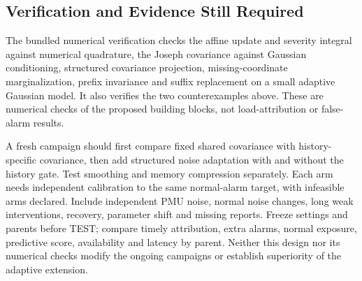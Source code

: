 \subsection{Verification and Evidence Still Required}
The bundled numerical verification checks the
affine update and severity integral against numerical quadrature, the
Joseph covariance against Gaussian conditioning, structured covariance
projection, missing-coordinate marginalization, prefix invariance and
suffix replacement on a small adaptive Gaussian model. It also verifies
the two counterexamples above. These are numerical checks of the proposed
building blocks, not load-attribution or false-alarm results.

A fresh campaign should first compare fixed shared covariance with
history-specific covariance, then add structured noise adaptation with
and without the history gate. Test smoothing and memory compression
separately. Each arm needs independent calibration to the same normal-alarm
target, with infeasible arms declared. Include independent PMU noise,
normal noise changes, long weak interventions, recovery, parameter shift
and missing reports. Freeze settings and parents before TEST; compare
timely attribution, extra alarms, normal exposure, predictive score,
availability and latency by parent. Neither this design nor its numerical
checks modify the ongoing campaigns or establish superiority of the adaptive extension.
